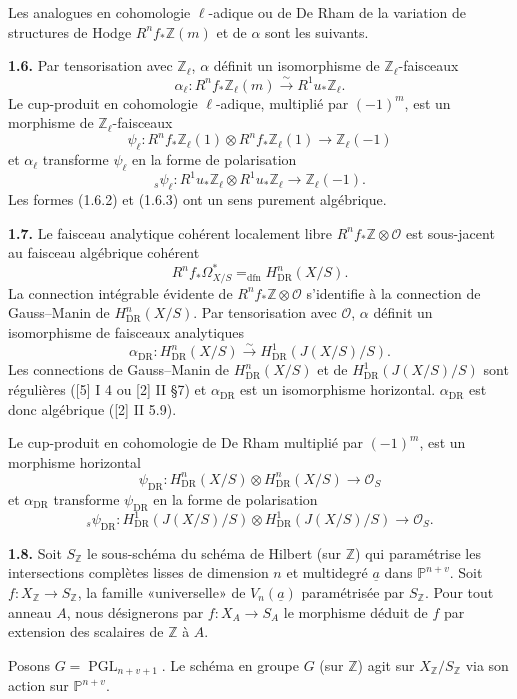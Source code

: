 \documentclass[10pt]{article}
\newcommand{\Pj}{\mathbb P}
\newcommand{\Z}{\mathbb Z}
\newcommand{\DR}{\mathrm{DR}}
\newcommand{\PGL}{\operatorname{PGL}}
\newcommand{\iso}{\xrightarrow{\sim}}
\newcommand{\dfneq}{\mathrel{=_{\mathrm{dfn}}}}
\newcommand{\sourcebreak}{\clearpage}
\begin{document}
Les analogues en cohomologie \(\ell\)-adique ou de De Rham de la variation de structures de Hodge \(R^nf_*\Z(m)\) et de \(\alpha\) sont les suivants.

\noindent\textbf{1.6.} Par tensorisation avec \(\Z_\ell\), \(\alpha\) définit un isomorphisme de \(\Z_\ell\)-faisceaux
\[
\tag{1.6.1}
\alpha_\ell:R^nf_*\Z_\ell(m)\iso R^1u_*\Z_\ell.
\]
Le cup-produit en cohomologie \(\ell\)-adique, multiplié par \((-1)^m\), est un morphisme de \(\Z_\ell\)-faisceaux
\[
\tag{1.6.2}
\psi_\ell:R^nf_*\Z_\ell(1)\otimes R^nf_*\Z_\ell(1)\longrightarrow\Z_\ell(-1)
\]
et \(\alpha_\ell\) transforme \(\psi_\ell\) en la forme de polarisation
\[
\tag{1.6.3}
{}_s\psi_\ell:R^1u_*\Z_\ell\otimes R^1u_*\Z_\ell\longrightarrow\Z_\ell(-1).
\]
Les formes (1.6.2) et (1.6.3) ont un sens purement algébrique.

\noindent\textbf{1.7.} Le faisceau analytique cohérent localement libre \(R^nf_*\Z\otimes\mathcal O\) est sous-jacent au faisceau algébrique cohérent
\[
R^nf_*\Omega^*_{X/S}\dfneq H^n_{\DR}(X/S).
\]
La connection intégrable évidente de \(R^nf_*\Z\otimes\mathcal O\) s'identifie à la connection de Gauss--Manin de \(H^n_{\DR}(X/S)\). Par tensorisation avec \(\mathcal O\), \(\alpha\) définit un isomorphisme de faisceaux analytiques
\[
\tag{1.7.1}
\alpha_{\DR}:H^n_{\DR}(X/S)\iso H^1_{\DR}(J(X/S)/S).
\]
Les connections de Gauss--Manin de \(H^n_{\DR}(X/S)\) et de \(H^1_{\DR}(J(X/S)/S)\) sont régulières ([5] I 4 ou [2] II \S 7) et \(\alpha_{\DR}\) est un isomorphisme horizontal. \(\alpha_{\DR}\) est donc algébrique ([2] II 5.9).

Le cup-produit en cohomologie de De Rham multiplié par \((-1)^m\), est un morphisme horizontal
\[
\tag{1.7.2}
\psi_{\DR}:H^n_{\DR}(X/S)\otimes H^n_{\DR}(X/S)\longrightarrow\mathcal O_S
\]
et \(\alpha_{\DR}\) transforme \(\psi_{\DR}\) en la forme de polarisation
\[
\tag{1.7.3}
{}_s\psi_{\DR}:H^1_{\DR}(J(X/S)/S)\otimes H^1_{\DR}(J(X/S)/S)\longrightarrow\mathcal O_S.
\]

\sourcebreak
\noindent\textbf{1.8.} Soit \(S_\Z\) le sous-schéma du schéma de Hilbert (sur \(\Z\)) qui paramétrise les intersections complètes lisses de dimension \(n\) et multidegré \(\underline a\) dans \(\Pj^{n+v}\). Soit \(f:X_\Z\to S_\Z\), la famille «universelle» de \(V_n(\underline a)\) paramétrisée par \(S_\Z\). Pour tout anneau \(A\), nous désignerons par \(f:X_A\to S_A\) le morphisme déduit de \(f\) par extension des scalaires de \(\Z\) à \(A\).

Posons \(G=\PGL_{n+v+1}\). Le schéma en groupe \(G\) (sur \(\Z\)) agit sur \(X_\Z/S_\Z\) via son action sur \(\Pj^{n+v}\).
\end{document}
